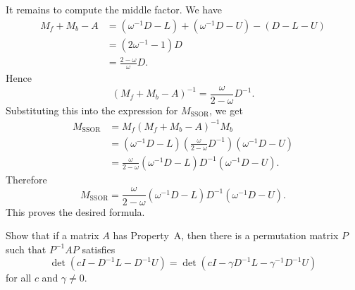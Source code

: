 \documentclass{ctexart}
\begin{document}
\begin{solution}
  It remains to compute the middle factor. We have
  \[
    \begin{aligned}
      M_f+M_b-A
      &=
      (\omega^{-1}D-L)+(\omega^{-1}D-U)-(D-L-U) \\
      &=
      (2\omega^{-1}-1)D \\
      &=
      \frac{2-\omega}{\omega}D.
    \end{aligned}
  \]
  Hence
  \[
    (M_f+M_b-A)^{-1}
    =
    \frac{\omega}{2-\omega}D^{-1}.
  \]
  Substituting this into the expression for \(M_{\mathrm{SSOR}}\), we get
  \[
    \begin{aligned}
      M_{\mathrm{SSOR}}
      &=
      M_f(M_f+M_b-A)^{-1}M_b \\
      &=
      (\omega^{-1}D-L)
      \left(\frac{\omega}{2-\omega}D^{-1}\right)
      (\omega^{-1}D-U) \\
      &=
      \frac{\omega}{2-\omega}
      (\omega^{-1}D-L)
      D^{-1}
      (\omega^{-1}D-U).
    \end{aligned}
  \]
  Therefore
  \[
    \boxed{
      M_{\mathrm{SSOR}}
      =
      \frac{\omega}{2-\omega}
      \left(\omega^{-1}D-L\right)
      D^{-1}
      \left(\omega^{-1}D-U\right)
    }.
  \]
  This proves the desired formula.
\end{solution}
\begin{problem}\label{pro:5}
  Show that if a matrix $A$ has Property~A, then there is a
  permutation matrix $P$ such that $P^{-1}AP$ satisfies
  \begin{equation}
    \det\!\left(cI-D^{-1}L-D^{-1}U\right)
    =
    \det\!\left(cI-\gamma D^{-1}L-\gamma^{-1}D^{-1}U\right)
    \tag{2}
  \end{equation}
  for all $c$ and $\gamma \neq 0$.
\end{problem}
\end{document}
